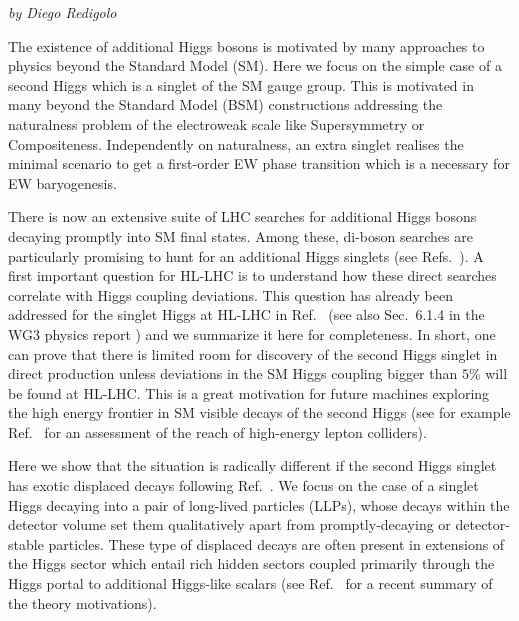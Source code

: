\begin{center}
{\it by Diego Redigolo}
\end{center}

The existence of additional Higgs bosons is motivated by many
approaches to physics beyond the Standard Model (SM). Here we focus on the simple case of a second Higgs which is a singlet of the SM gauge group. This is motivated in many beyond the Standard Model (BSM) constructions addressing the naturalness problem of the electroweak scale like Supersymmetry or Compositeness. Independently on naturalness, an extra singlet realises the minimal scenario to get a first-order EW phase transition which is a necessary for EW baryogenesis. 

There is now an extensive suite of LHC searches for additional Higgs bosons decaying promptly into SM
final states. Among these, di-boson searches are particularly promising to hunt for an additional Higgs singlets (see Refs.~\cite{Sirunyan:2018qlb,Aaboud:2018knk,Sirunyan:2017isc,ATLAS:2017spa}). A first important question for HL-LHC is to understand how these direct searches correlate with Higgs coupling deviations. This question has already been addressed for the singlet Higgs at HL-LHC in Ref.~\cite{Buttazzo:2015bka} (see also Sec.~6.1.4 in the WG3 physics report \cite{CidVidal:2018eel}) and we summarize it here for completeness. In short, one can prove that there is limited room for discovery of the second Higgs singlet in direct production unless deviations in the SM Higgs coupling bigger than $5\%$ will be found at HL-LHC. This is a great motivation for future machines exploring the high energy frontier in SM visible decays of the second Higgs (see for example Ref.~\cite{Buttazzo:2018qqp} for an assessment of the reach of high-energy lepton colliders). 

Here we show that the situation is radically different if the second Higgs singlet has exotic displaced decays following Ref.~\cite{Alipour-fard:2018mre}. We focus on the case of a singlet Higgs decaying into a pair of long-lived particles (LLPs), whose decays within the detector volume set them qualitatively apart from promptly-decaying or detector-stable
particles. These type of displaced decays are often present in extensions of the Higgs sector which entail rich hidden sectors coupled primarily through the Higgs portal to additional Higgs-like scalars (see Ref.~\cite{Curtin:2018mvb} for a recent summary of the theory motivations).  

